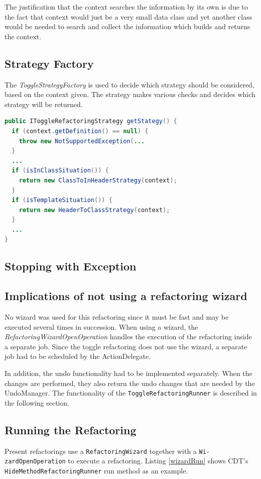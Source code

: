 The justification that the context searches the information by its own is due
to the fact that context would just be a very small data class and yet another
class would be needed to search and collect the information which builds and
returns the context.

\subsection{Strategy Factory}
\label{factory}

The \textit{ToggleStrategyFactory} is used to decide which strategy should be 
considered, based on the context given. The strategy makes various checks
and decides which strategy will be returned.

\begin{lstlisting}[caption={IToggleRefactoringStrategy},
label={strategy}, language=Java]
public IToggleRefactoringStrategy getStategy() {
  if (context.getDefinition() == null) {
    throw new NotSupportedException(...
  }
  ...
  if (isInClassSituation()) {
    return new ClassToInHeaderStrategy(context);
  }
  if (isTemplateSituation()) {
    return new HeaderToClassStrategy(context);
  }
  ...
}
\end{lstlisting}

\subsection{Stopping with Exception}


\subsection{Implications of not using a refactoring wizard}
No wizard was used for this refactoring since it must be fast and may be 
executed several times in succession. When using a wizard, the 
\textit{RefactoringWizardOpenOperation} handles the execution of the refactoring 
inside a separate job. Since the toggle refactoring does not use the wizard, a 
separate job had to be scheduled by the ActionDelegate.

In addition, the undo functionality had to be implemented separately. When the 
changes are performed, they also return the undo changes that are needed by the
UndoManager. The functionality of the \texttt{ToggleRefactoringRunner} is
described in the following section.

\subsection{Running the Refactoring}\label{runnersec}
Present refactorings use a \texttt{RefactoringWizard} together with a 
\texttt{Wi- zardOpenOperation} to execute a refactoring. Listing \ref{wizardRun} 
shows CDT's \texttt{HideMethodRefactoringRunner} run method as an example.

